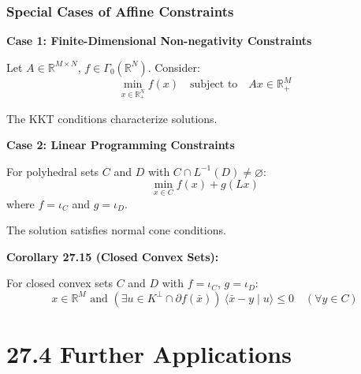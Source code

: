 \documentclass[aspectratio=169,10pt]{beamer}
\begin{document}
\begin{frame}[allowframebreaks]
\frametitle{Special Cases of Affine Constraints}

\textbf{Case 1: Finite-Dimensional Non-negativity Constraints}

Let $A \in \mathbb{R}^{M \times N}$, $f \in \Gamma_0(\mathbb{R}^N)$. Consider:
\[\min_{x \in \mathbb{R}_+^N} f(x) \quad \text{subject to} \quad Ax \in \mathbb{R}_+^M\]

The KKT conditions characterize solutions.

\vspace{0.3cm}

\textbf{Case 2: Linear Programming Constraints}

For polyhedral sets $C$ and $D$ with $C \cap L^{-1}(D) \neq \varnothing$:
\[\min_{x \in C} f(x) + g(Lx)\]
where $f = \iota_C$ and $g = \iota_D$.

The solution satisfies normal cone conditions.

\vspace{0.3cm}

\textbf{Corollary 27.15 (Closed Convex Sets):}

For closed convex sets $C$ and $D$ with $f = \iota_C$, $g = \iota_D$:
\[x \in \mathbb{R}^M \text{ and } (\exists u \in K^\perp \cap \partial f(\bar{x}))\ \langle \bar{x} - y \mid u \rangle \leq 0 \quad (\forall y \in C)\]

\end{frame}

\section{27.4 Further Applications}
\end{document}
